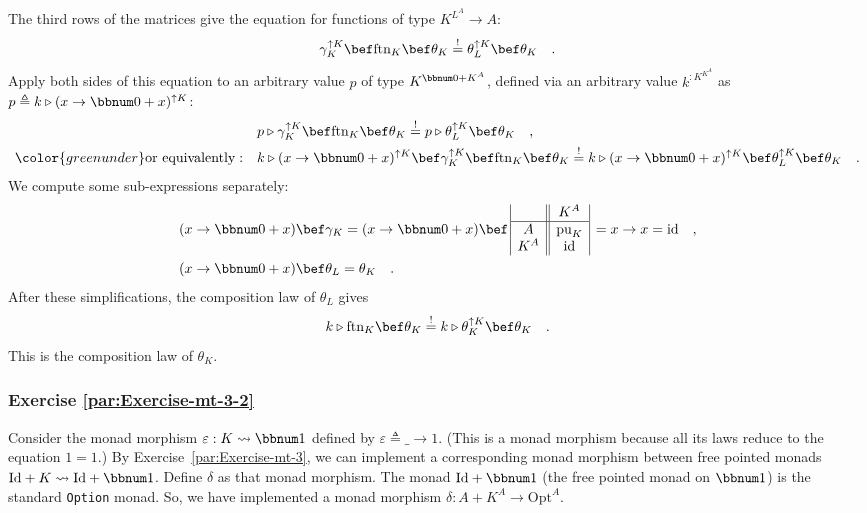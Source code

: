 The third rows of the matrices give the equation for functions of
type $K^{L^{A}}\rightarrow A$:
\[
\gamma_{K}^{\uparrow K}\bef\text{ftn}_{K}\bef\theta_{K}\overset{!}{=}\theta_{L}^{\uparrow K}\bef\theta_{K}\quad.
\]
Apply both sides of this equation to an arbitrary value $p$ of type
$K^{\bbnum 0+K^{A}}$, defined via an arbitrary value $k^{:K^{K^{A}}}$
as $p\triangleq k\triangleright(x\rightarrow\bbnum 0+x)^{\uparrow K}$:
\begin{align*}
 & p\triangleright\gamma_{K}^{\uparrow K}\bef\text{ftn}_{K}\bef\theta_{K}\overset{!}{=}p\triangleright\theta_{L}^{\uparrow K}\bef\theta_{K}\quad,\\
{\color{greenunder}\text{or equivalently}:}\quad & k\triangleright(x\rightarrow\bbnum 0+x)^{\uparrow K}\bef\gamma_{K}^{\uparrow K}\bef\text{ftn}_{K}\bef\theta_{K}\overset{!}{=}k\triangleright(x\rightarrow\bbnum 0+x)^{\uparrow K}\bef\theta_{L}^{\uparrow K}\bef\theta_{K}\quad.
\end{align*}
We compute some sub-expressions separately:
\begin{align*}
 & (x\rightarrow\bbnum 0+x)\bef\gamma_{K}=(x\rightarrow\bbnum 0+x)\bef\,\begin{array}{|c||c|}
 & K^{A}\\
\hline A & \text{pu}_{K}\\
K^{A} & \text{id}
\end{array}\,=x\rightarrow x=\text{id}\quad,\\
 & (x\rightarrow\bbnum 0+x)\bef\theta_{L}=\theta_{K}\quad.
\end{align*}
After these simplifications, the composition law of $\theta_{L}$
gives
\[
k\triangleright\text{ftn}_{K}\bef\theta_{K}\overset{!}{=}k\triangleright\theta_{K}^{\uparrow K}\bef\theta_{K}\quad.
\]
This is the composition law of $\theta_{K}$.

\subsubsection*{Exercise \ref{par:Exercise-mt-3-2}}

Consider the monad morphism $\varepsilon:K\leadsto\bbnum 1$ defined
by $\varepsilon\triangleq\_\rightarrow1$. (This is a monad morphism
because all its laws reduce to the equation $1=1$.) By Exercise~\ref{par:Exercise-mt-3},
we can implement a corresponding monad morphism between free pointed
monads $\text{Id}+K\leadsto\text{Id}+\bbnum 1$. Define $\delta$
as that monad morphism. The monad $\text{Id}+\bbnum 1$ (the free
pointed monad on $\bbnum 1$) is the standard \lstinline!Option!
monad. So, we have implemented a monad morphism $\delta:A+K^{A}\rightarrow\text{Opt}^{A}$.

